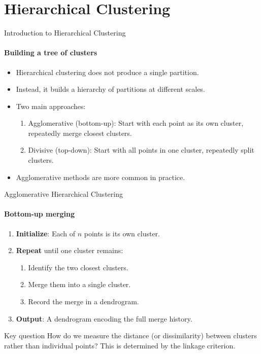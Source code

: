 \section{Hierarchical Clustering}

\begin{frame}{Introduction to Hierarchical Clustering}
  \framesubtitle{Building a tree of clusters}
  \begin{itemize}
    \item Hierarchical clustering does not produce a single partition.
    \item Instead, it builds a \alert{hierarchy} of partitions at different scales.
    \item Two main approaches:
      \begin{enumerate}
        \item \alert{Agglomerative} (bottom-up): Start with each point as its own cluster,
              repeatedly merge closest clusters.
        \item \alert{Divisive} (top-down): Start with all points in one cluster, repeatedly
              split clusters.
      \end{enumerate}
    \item Agglomerative methods are more common in practice.
  \end{itemize}
\end{frame}

\begin{frame}{Agglomerative Hierarchical Clustering}
  \framesubtitle{Bottom-up merging}
  \begin{enumerate}
    \item \textbf{Initialize}: Each of $n$ points is its own cluster.
    \item \textbf{Repeat} until one cluster remains:
      \begin{enumerate}
        \item Identify the two \alert{closest} clusters.
        \item Merge them into a single cluster.
        \item Record the merge in a dendrogram.
      \end{enumerate}
    \item \textbf{Output}: A dendrogram encoding the full merge history.
  \end{enumerate}
  \vspace{0.4em}
  \begin{block}{Key question}
    How do we measure the distance (or dissimilarity) between \alert{clusters} rather than
    individual points? This is determined by the \alert{linkage criterion}.
  \end{block}
\end{frame}

